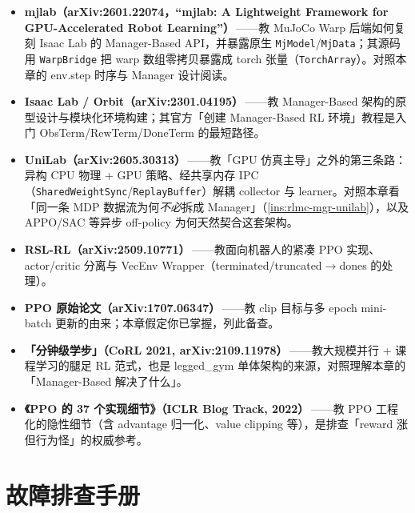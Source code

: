 \begin{itemize}
  \item \textbf{mjlab（arXiv:2601.22074，``mjlab: A Lightweight Framework for GPU-Accelerated Robot Learning''）}\,\cite{mjlab2026}——教 MuJoCo Warp 后端如何复刻 Isaac Lab 的 Manager-Based API，并暴露原生 \verb|MjModel|/\verb|MjData|；其源码用 \verb|WarpBridge| 把 warp 数组零拷贝暴露成 torch 张量（\verb|TorchArray|）。对照本章的 env.step 时序与 Manager 设计阅读。
  \item \textbf{Isaac Lab / Orbit（arXiv:2301.04195）}\,\cite{isaaclab2024}——教 Manager-Based 架构的原型设计与模块化环境构建；其官方「创建 Manager-Based RL 环境」教程是入门 ObsTerm/RewTerm/DoneTerm 的最短路径。
  \item \textbf{UniLab（arXiv:2605.30313）}\,\cite{unilab2026}——教「GPU 仿真主导」之外的第三条路：异构 CPU 物理 + GPU 策略、经共享内存 IPC（\verb|SharedWeightSync|/\verb|ReplayBuffer|）解耦 collector 与 learner。对照本章看「同一条 MDP 数据流为何\emph{不必}拆成 Manager」（\cref{ins:rlmc-mgr-unilab}），以及 APPO/SAC 等异步 off-policy 为何天然契合这套架构。
  \item \textbf{RSL-RL（arXiv:2509.10771）}\,\cite{schwarke2025rslrl}——教面向机器人的紧凑 PPO 实现、actor/critic 分离与 VecEnv Wrapper（terminated/truncated$\to$dones 的处理）。
  \item \textbf{PPO 原始论文（arXiv:1707.06347）}\,\cite{schulman2017ppo}——教 clip 目标与多 epoch mini-batch 更新的由来；本章假定你已掌握，列此备查。
  \item \textbf{「分钟级学步」（CoRL 2021, arXiv:2109.11978）}\,\cite{rudin2021minutes}——教大规模并行 + 课程学习的腿足 RL 范式，也是 legged\_gym 单体架构的来源，对照理解本章的「Manager-Based 解决了什么」。
  \item \textbf{《PPO 的 37 个实现细节》（ICLR Blog Track, 2022）}\,\cite{huang202237ppo}——教 PPO 工程化的隐性细节（含 advantage 归一化、value clipping 等），是排查「reward 涨但行为怪」的权威参考。
\end{itemize}

\section*{故障排查手册}
\label{sec:rlmc-mgr-troubleshoot}

